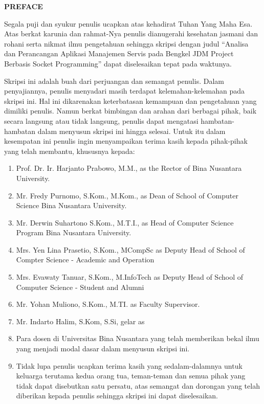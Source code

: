 \renewcommand{\baselinestretch}{1.5}\normalsize

\begingroup
\begin{center}
\fontsize{16pt}{12pt}\selectfont
\textbf{PREFACE}
\end{center}
\endgroup
\justify
\tab Segala puji dan syukur penulis ucapkan atas kehadirat Tuhan Yang Maha Esa. Atas berkat karunia dan rahmat-Nya penulis dianugerahi kesehatan jasmani dan rohani serta nikmat ilmu pengetahuan sehingga skripsi dengan judul “Analisa dan Perancangan Aplikasi Manajemen Servis pada Bengkel JDM Project Berbasis Socket Programming” dapat diselesaikan tepat pada waktunya.

\tab Skripsi ini adalah buah dari perjuangan dan semangat penulis. Dalam penyajiannya, penulis menyadari masih terdapat kelemahan-kelemahan pada skripsi ini. Hal ini dikarenakan keterbatasan kemampuan dan pengetahuan yang dimiliki penulis. Namun berkat bimbingan dan arahan dari berbagai pihak, baik secara langsung atau tidak langsung, penulis dapat mengatasi hambatan-hambatan dalam menyusun skripsi ini hingga selesai. Untuk itu dalam kesempatan ini penulis ingin menyampaikan terima kasih kepada pihak-pihak yang telah membantu, khususnya kepada:

\begin{enumerate}
\itemsep0em
\item Prof. Dr. Ir. Harjanto Prabowo, M.M., as the Rector of Bina Nusantara University.
\item Mr. Fredy Purnomo, S.Kom., M.Kom., as Dean of School of Computer Science Bina Nusantara University.
\item Mr. Derwin Suhartono S.Kom., M.T.I., as Head of Computer Science Program Bina Nusantara University.
\item Mrs. Yen Lina Prasetio, S.Kom., MCompSc as Deputy Head of School of Compter Science - Academic and Operation
\item Mrs. Evawaty Tanuar, S.Kom., M.InfoTech as Deputy Head of School of Computer Science - Student and Alumni
\item Mr. Yohan Muliono, S.Kom., M.TI. as Faculty Supervisor.
\item Mr. Indarto Halim, S.Kom, S.Si, gelar as
\item Para dosen di Universitas Bina Nusantara yang telah memberikan bekal ilmu yang menjadi modal dasar dalam menyusun skripsi ini.
\item Tidak lupa penulis ucapkan terima kasih yang sedalam-dalamnya untuk keluarga terutama kedua orang tua, teman-teman dan semua pihak yang tidak dapat disebutkan satu persatu, atas semangat dan dorongan yang telah diberikan kepada penulis sehingga skripsi ini dapat diselesaikan.
\end{enumerate}


